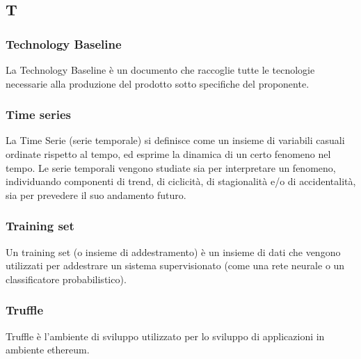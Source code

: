 \subsection*{\textbf{\hfill \Huge{T} \hfill}} 
\subsubsection*{Technology Baseline}
La Technology Baseline è un documento che raccoglie tutte le tecnologie necessarie alla produzione del prodotto sotto specifiche del proponente.
\subsubsection*{Time series}
La Time Serie (serie temporale) si definisce come un insieme di variabili casuali ordinate rispetto al tempo, ed esprime la dinamica di un certo fenomeno nel tempo. Le serie temporali vengono studiate sia per interpretare un fenomeno, individuando componenti di trend, di ciclicità, di stagionalità e/o di accidentalità, sia per prevedere il suo andamento futuro. 
\subsubsection*{Training set}
Un training set (o insieme di addestramento) è un insieme di dati che vengono utilizzati per addestrare un sistema supervisionato (come una rete neurale o un classificatore probabilistico).
\subsubsection*{Truffle}
Truffle è l'ambiente di sviluppo utilizzato per lo sviluppo di applicazioni in ambiente ethereum. 
